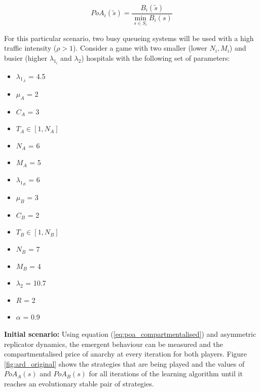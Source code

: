 \begin{equation}\label{eq:poa_compartmentalised}
    PoA_{i}(\tilde{s}) = \frac{B_i(\tilde{s})}{\min_{s \in S_i} B_i(s)}
\end{equation}

For this particular scenario, two busy queueing systems will be
used with a high traffic intensity (\(\rho > 1\)).
Consider a game with two smaller (lower \( N_i, M_i \)) and busier (higher 
\(\lambda_{1_i} \) and \(\lambda_2\)) hospitals with the following set of 
parameters:

\begin{multicols}{3}
    \begin{itemize}        
        \item \( \lambda_{1_A} \) = 4.5
        \item \( \mu_A \) = 2
        \item \( C_A \) = 3
        \item \( T_A \in [1, N_A] \) 
        \item \( N_A \) = 6
        \item \( M_A \) = 5

        \columnbreak
        \item \( \lambda_{1_B} \) = 6
        \item \( \mu_B \) = 3
        \item \( C_B \) = 2
        \item \( T_B \in [1, N_B] \)
        \item \( N_B \) = 7
        \item \( M_B \) = 4
        
        \columnbreak
        \item \( \lambda_2 \) = 10.7
        \item \( R \) = 2
        \item \( \alpha \) = 0.9
    \end{itemize}
\end{multicols}

\textbf{Initial scenario:}
Using equation (\ref{eq:poa_compartmentalised}) and asymmetric replicator 
dynamics, the emergent behaviour can be measured and the compartmentalised price 
of anarchy at every iteration for both players.
Figure \ref{fig:ard_original} shows the strategies that are being played and 
the values of \(PoA_A(s)\) and \(PoA_B(s)\) for all iterations of the 
learning algorithm until it reaches an evolutionary stable pair of strategies.

